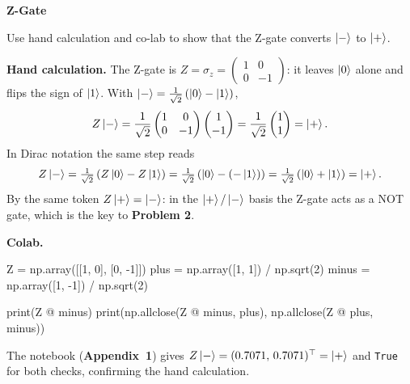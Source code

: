 \documentclass[a4paper, 10pt]{article}
\begin{document}
\subject
{}

\begin{problem}
\textbf{Z-Gate}
\par Use hand calculation and co-lab to show that the Z-gate converts \( \ket{-} \) to \( \ket{+} \).
\end{problem}

\begin{solution}
	\noindent \textbf{Hand calculation.} The Z-gate is \( Z = \sigma_z = \begin{pmatrix} 1 & 0 \\ 0 & -1 \end{pmatrix} \): it leaves \( \ket{0} \) alone and flips the sign of \( \ket{1} \).
	With \( \ket{-} = \tfrac{1}{\sqrt{2}}\left(\ket{0} - \ket{1}\right) \),
	\[
		Z\ket{-}
		= \frac{1}{\sqrt{2}}\begin{pmatrix} 1 & 0 \\ 0 & -1 \end{pmatrix}\begin{pmatrix} 1 \\ -1 \end{pmatrix}
		= \frac{1}{\sqrt{2}}\begin{pmatrix} 1 \\ 1 \end{pmatrix}
		= \ket{+}.
	\]
	In Dirac notation the same step reads
	\[
		Z\ket{-}
		= \tfrac{1}{\sqrt{2}}\left(Z\ket{0} - Z\ket{1}\right)
		= \tfrac{1}{\sqrt{2}}\left(\ket{0} - (-\ket{1})\right)
		= \tfrac{1}{\sqrt{2}}\left(\ket{0} + \ket{1}\right)
		= \ket{+}.
	\]
	By the same token \( Z\ket{+} = \ket{-} \): in the \( \ket{+}/\ket{-} \) basis the Z-gate acts as a NOT gate, which is the key to \textbf{Problem 2}.

	\noindent \textbf{Colab.}
	\begin{codingbox*}
Z     = np.array([[1, 0], [0, -1]])
plus  = np.array([1,  1]) / np.sqrt(2)
minus = np.array([1, -1]) / np.sqrt(2)

print(Z @ minus)
print(np.allclose(Z @ minus, plus), np.allclose(Z @ plus, minus))
\end{codingbox*}
	\noindent The notebook (\textbf{Appendix~1}) gives \( Z\ket{-} = (0.7071,\, 0.7071)^{\top} = \ket{+} \) and \texttt{True} for both checks, confirming the hand calculation.
\end{solution}
\end{document}
